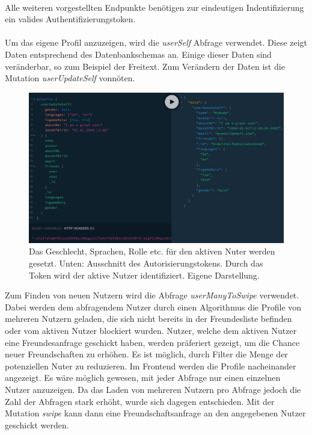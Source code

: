 \paragraph{}
Alle weiteren vorgestellten Endpunkte benötigen zur eindeutigen Indentifizierung ein valides Authentifizierungstoken.

\paragraph{}
Um das eigene Profil anzuzeigen, wird die \textit{userSelf} Abfrage verwendet.
Diese zeigt Daten entsprechend des Datenbankschemas an.
Einige dieser Daten sind veränderbar, so zum Beispiel der Freitext.
Zum Verändern der Daten ist die Mutation \textit{userUpdateSelf} vonnöten.

\begin{figure}
	\centering
    \includegraphics[width=\textwidth]{sources/graphiql_userUpdateSelf.png}
	\caption{Das Geschlecht, Sprachen, Rolle etc. für den aktiven Nuter werden gesetzt. Unten: Ausschnitt des Autorisierungstokens. Durch das Token wird der aktive Nutzer identifiziert. Eigene Darstellung.}
	\label{fig:gql:4}
\end{figure}

Zum Finden von neuen Nutzern wird die Abfrage \textit{userManyToSwipe} verwendet. Dabei werden dem abfragendem Nutzer durch einen Algorithmus die Profile von mehreren Nutzern geladen, die sich nicht bereits in der Freundesliste befinden oder vom aktiven Nutzer blockiert wurden.
Nutzer, welche dem aktiven Nutzer eine Freundesanfrage geschickt haben, werden präferiert gezeigt, um die Chance neuer Freundschaften zu erhöhen.
Es ist möglich, durch Filter die Menge der potenziellen Nuter zu reduzieren.
Im Frontend werden die Profile nacheinander angezeigt.
Es wäre möglich gewesen,  mit jeder Abfrage nur einen einzelnen Nutzer anzuzeigen.
Da das Laden von mehreren Nutzern pro Abfrage jedoch die Zahl der Abfragen stark erhöht, wurde sich dagegen entschieden.
Mit der Mutation \textit{swipe} kann dann eine Freundschaftsanfrage an den angegebenen Nutzer geschickt werden.

